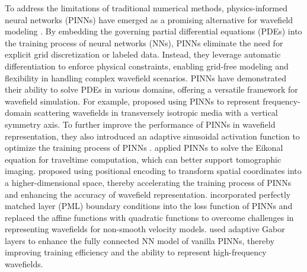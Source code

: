 
To address the limitations of traditional numerical methods, physics-informed neural networks (PINNs) \citep{raissi2019physics} have emerged as a promising alternative for wavefield modeling \citep{rasht2022physics, waheed2022kronecker, sandhu2023multi, schuster2024review, chai2024modeling}. By embedding the governing partial differential equations (PDEs) into the training process of neural networks (NNs), PINNs eliminate the need for explicit grid discretization or labeled data. Instead, they leverage automatic differentiation to enforce physical constraints, enabling grid-free modeling and flexibility in handling complex wavefield scenarios. PINNs have demonstrated their ability to solve PDEs in various domains, offering a versatile framework for wavefield simulation. For example, \cite{song2021solving} proposed using PINNs to represent frequency-domain scattering wavefields in transversely isotropic media with a vertical symmetry axis. To further improve the performance of PINNs in wavefield representation, they also introduced an adaptive sinusoidal activation function to optimize the training process of PINNs \citep{song2022versatile}. \cite{bin2021pinneik} applied PINNs to solve the Eikonal equation for traveltime computation, which can better support tomographic imaging. \cite{huang2021modified} proposed using positional encoding to transform spatial coordinates into a higher-dimensional space, thereby accelerating the training process of PINNs and enhancing the accuracy of wavefield representation. \cite{wu2023helmholtz} incorporated perfectly matched layer (PML) boundary conditions into the loss function of PINNs and replaced the affine functions with quadratic functions to overcome challenges in representing wavefields for non-smooth velocity models. \cite{alkhalifah2024physics} used adaptive Gabor layers to enhance the fully connected NN model of vanilla PINNs, thereby improving training efficiency and the ability to represent high-frequency wavefields.

